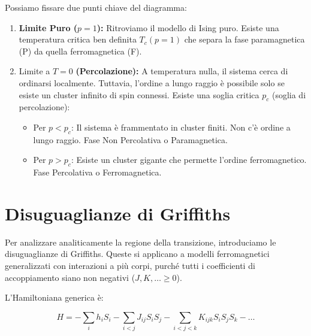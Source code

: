 Possiamo fissare due punti chiave del diagramma:
\begin{enumerate}
    \item \textbf{Limite Puro ($p=1$):} Ritroviamo il modello di Ising puro. Esiste una temperatura critica ben definita $T_c(p=1)$ che separa la fase paramagnetica (P) da quella ferromagnetica (F).
    \item Limite a $T=0$ \textbf{(Percolazione):} A temperatura nulla, il sistema cerca di ordinarsi localmente. Tuttavia, l'ordine a lungo raggio è possibile solo se esiste un cluster infinito di spin connessi. Esiste una soglia critica $p_c$ (soglia di percolazione):
    \begin{itemize}
        \item Per $p < p_c$: Il sistema è frammentato in cluster finiti. Non c'è ordine a lungo raggio. Fase Non Percolativa o Paramagnetica.
        \item Per $p > p_c$: Esiste un cluster gigante che permette l'ordine ferromagnetico. Fase Percolativa o Ferromagnetica.
    \end{itemize}
\end{enumerate}

\section{Disuguaglianze di Griffiths}

Per analizzare analiticamente la regione della transizione, introduciamo le disuguaglianze di Griffiths. Queste si applicano a modelli ferromagnetici generalizzati con interazioni a più corpi, purché tutti i coefficienti di accoppiamento siano non negativi ($J, K, \dots \ge 0$).

L'Hamiltoniana generica è:

\begin{equation}
H = - \sum_i h_i S_i - \sum_{i<j} J_{ij} S_i S_j - \sum_{i<j<k} K_{ijk} S_i S_j S_k - \dots
\end{equation}

